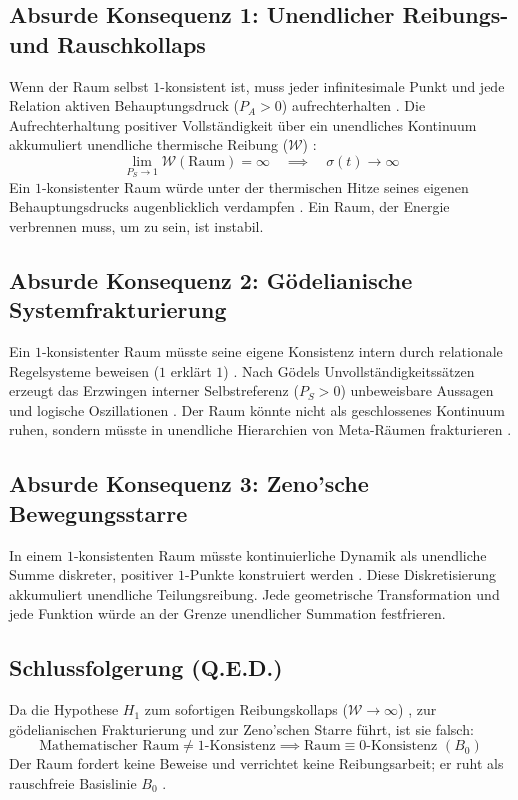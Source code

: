 \documentclass[11pt,a4paper]{article}
\begin{document}
\subsection{Absurde Konsequenz 1: Unendlicher Reibungs- und Rauschkollaps}
Wenn der Raum selbst $1$-konsistent ist, muss jeder infinitesimale Punkt und jede Relation aktiven Behauptungsdruck ($P_A > 0$) aufrechterhalten \cite{nicht_physics_paper_1}. Die Aufrechterhaltung positiver Vollständigkeit über ein unendliches Kontinuum akkumuliert unendliche thermische Reibung ($\mathcal{W}$) \cite{nicht_physics_paper_3, poincare1890probleme}:
\begin{equation}
\lim_{P_S \to 1} \mathcal{W}(\text{Raum}) = \infty \quad \implies \quad \sigma(t) \to \infty
\end{equation}
Ein $1$-konsistenter Raum würde unter der thermischen Hitze seines eigenen Behauptungsdrucks augenblicklich verdampfen \cite{nicht_physics_paper_1, nicht_physics_paper_3}. Ein Raum, der Energie verbrennen muss, um zu sein, ist instabil.

\subsection{Absurde Konsequenz 2: Gödelianische Systemfrakturierung}
Ein $1$-konsistenter Raum müsste seine eigene Konsistenz intern durch relationale Regelsysteme beweisen ($1$ erklärt $1$) \cite{godel1931formal, tarski1936begriff}. Nach Gödels Unvollständigkeitssätzen erzeugt das Erzwingen interner Selbstreferenz ($P_S > 0$) unbeweisbare Aussagen und logische Oszillationen \cite{godel1931formal}. Der Raum könnte nicht als geschlossenes Kontinuum ruhen, sondern müsste in unendliche Hierarchien von Meta-Räumen frakturieren \cite{tarski1936begriff, nicht_theory_monograph}.

\subsection{Absurde Konsequenz 3: Zeno'sche Bewegungsstarre}
In einem $1$-konsistenten Raum müsste kontinuierliche Dynamik als unendliche Summe diskreter, positiver $1$-Punkte konstruiert werden \cite{nicht_physics_paper_4, poincare1890probleme}. Diese Diskretisierung akkumuliert unendliche Teilungsreibung. Jede geometrische Transformation und jede Funktion würde an der Grenze unendlicher Summation festfrieren.

\subsection{Schlussfolgerung (Q.E.D.)}
Da die Hypothese $H_1$ zum sofortigen Reibungskollaps ($\mathcal{W} \to \infty$) \cite{nicht_physics_paper_1}, zur gödelianischen Frakturierung \cite{godel1931formal} und zur Zeno'schen Starre führt, ist sie falsch:
\begin{equation}
\text{Mathematischer Raum} \neq 1\text{-Konsistenz} \implies \text{Raum} \equiv 0\text{-Konsistenz } (B_0)
\end{equation}
Der Raum fordert keine Beweise und verrichtet keine Reibungsarbeit; er ruht als rauschfreie Basislinie $B_0$ \cite{nicht_theory_monograph}.
\end{document}
